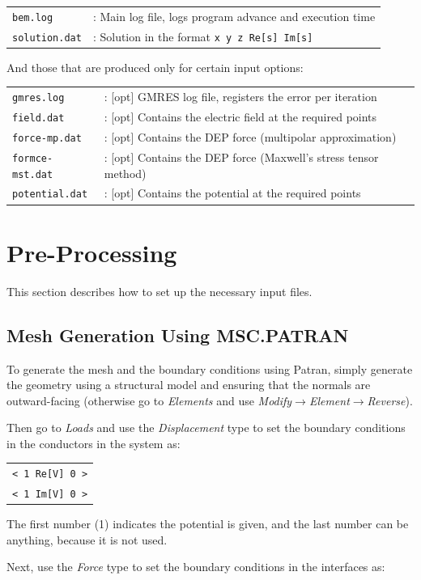 \documentclass[12pt]{article}
\begin{document}
\begin{tabular}{ll}
\texttt{bem.log}&: Main log file, logs program advance and execution time\\
\texttt{solution.dat}&: Solution in the format \texttt{x y z Re[s] Im[s]}
\end{tabular}

And those that are produced only for certain input options:

\begin{tabular}{ll}
\texttt{gmres.log}&: [opt] GMRES log file, registers the error per iteration\\
\texttt{field.dat}&: [opt] Contains the electric field at the required points\\
\texttt{force-mp.dat}&: [opt] Contains the DEP force (multipolar approximation)\\
\texttt{formce-mst.dat}&: [opt] Contains the DEP force (Maxwell's stress tensor method)\\
\texttt{potential.dat}&: [opt] Contains the potential at the required points\\
\end{tabular}

\section{Pre-Processing}
This section describes how to set up the necessary input files.

\subsection{Mesh Generation Using MSC.PATRAN}
To generate the mesh and the boundary conditions using Patran, simply generate the geometry using a structural model and ensuring that the normals are outward-facing (otherwise go to {\it Elements} and use {\it Modify$\rightarrow$Element$\rightarrow$Reverse}).

Then go to {\it Loads} and use the {\it Displacement} type to set the boundary conditions in the conductors in the system as:

\begin{tabular}{l}
\texttt{< 1 Re[V] 0 >}\\
\texttt{< 1 Im[V] 0 >}
\end{tabular}

The first number (1) indicates the potential is given, and the last number can be anything, because it is not used.

Next, use the {\it Force} type to set the boundary conditions in the interfaces as:
\end{document}
